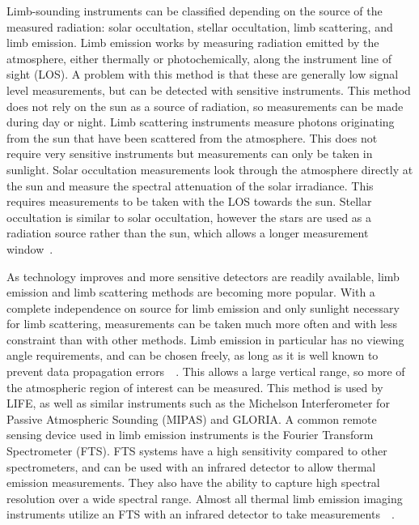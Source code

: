 Limb-sounding instruments can be classified depending on the source of the measured radiation: solar occultation, stellar occultation, limb scattering, and limb emission. Limb emission works by measuring radiation emitted by the atmosphere, either thermally or photochemically, along the instrument line of sight (LOS). A problem with this method is that these are generally low signal level measurements, but can be detected with sensitive instruments. This method does not rely on the sun as a source of radiation, so measurements can be made during day or night. Limb scattering instruments measure photons originating from the sun that have been scattered from the atmosphere. This does not require very sensitive instruments but measurements can only be taken in sunlight. Solar occultation measurements look through the atmosphere directly at the sun and measure the spectral attenuation of the solar irradiance. This requires measurements to be taken with the LOS towards the sun. Stellar occultation is similar to solar occultation, however the stars are used as a radiation source rather than the sun, which allows a longer measurement window~\citep{SPARC}.

As technology improves and more sensitive detectors are readily available, limb emission and limb scattering methods are becoming more popular. With a complete independence on source for limb emission and only sunlight necessary for limb scattering, measurements can be taken much more often and with less constraint than with other methods. Limb emission in particular has no viewing angle requirements, and can be chosen freely, as long as it is well known to prevent data propagation errors~\citep{IR_limb_emission_measurements}~\citep{SPARC}. This allows a large vertical range, so more of the atmospheric region of interest can be measured. This method is used by LIFE, as well as similar instruments such as the Michelson Interferometer for Passive Atmospheric Sounding (MIPAS) and GLORIA. A common remote sensing device used in limb emission instruments is the Fourier Transform Spectrometer (FTS). FTS systems have a high sensitivity compared to other spectrometers, and can be used with an infrared detector to allow thermal emission measurements. They also have the ability to capture high spectral resolution over a wide spectral range. Almost all thermal limb emission imaging instruments utilize an FTS with an infrared detector to take measurements~\citep{GLORIA_concept}~\citep{MIPAS_instrument}. 

